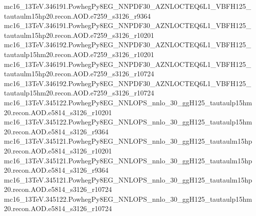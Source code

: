 {mc16\_13TeV.346191.PowhegPy8EG\_NNPDF30\_AZNLOCTEQ6L1\_VBFH125\_tautaulm15hp20.recon.AOD.e7259\_s3126\_r9364\newline  
mc16\_13TeV.346191.PowhegPy8EG\_NNPDF30\_AZNLOCTEQ6L1\_VBFH125\_tautaulm15hp20.recon.AOD.e7259\_s3126\_r10201\newline  
mc16\_13TeV.346192.PowhegPy8EG\_NNPDF30\_AZNLOCTEQ6L1\_VBFH125\_tautaulp15hm20.recon.AOD.e7259\_s3126\_r10201\newline  
mc16\_13TeV.346191.PowhegPy8EG\_NNPDF30\_AZNLOCTEQ6L1\_VBFH125\_tautaulm15hp20.recon.AOD.e7259\_s3126\_r10724\newline  
mc16\_13TeV.346192.PowhegPy8EG\_NNPDF30\_AZNLOCTEQ6L1\_VBFH125\_tautaulp15hm20.recon.AOD.e7259\_s3126\_r10724\newline  
mc16\_13TeV.345122.PowhegPy8EG\_NNLOPS\_nnlo\_30\_ggH125\_tautaulp15hm20.recon.AOD.e5814\_s3126\_r10201\newline  
mc16\_13TeV.345122.PowhegPy8EG\_NNLOPS\_nnlo\_30\_ggH125\_tautaulp15hm20.recon.AOD.e5814\_s3126\_r9364\newline  
mc16\_13TeV.345121.PowhegPy8EG\_NNLOPS\_nnlo\_30\_ggH125\_tautaulm15hp20.recon.AOD.e5814\_s3126\_r10201\newline  
mc16\_13TeV.345121.PowhegPy8EG\_NNLOPS\_nnlo\_30\_ggH125\_tautaulm15hp20.recon.AOD.e5814\_s3126\_r9364\newline  
mc16\_13TeV.345121.PowhegPy8EG\_NNLOPS\_nnlo\_30\_ggH125\_tautaulm15hp20.recon.AOD.e5814\_s3126\_r10724\newline  
mc16\_13TeV.345122.PowhegPy8EG\_NNLOPS\_nnlo\_30\_ggH125\_tautaulp15hm20.recon.AOD.e5814\_s3126\_r10724}	
